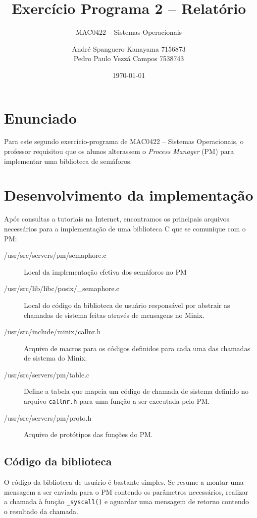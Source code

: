 \documentclass[brazil, a4paper]{scrartcl}
\begin{document}
\title{Exercício Programa 2 -- Relatório}
\subtitle{MAC0422 -- Sistemas Operacionais}
\author{André Spanguero Kanayama \hfill 7156873\\
		Pedro Paulo Vezzá Campos \hfill 7538743}
\date{\today}

\maketitle


\section{Enunciado}
Para este segundo exercício-programa de MAC0422 -- Sistemas Operacionais, o 
professor requisitou que os alunos alterassem o \emph{Process Manager} (PM)
para implementar uma biblioteca de semáforos. 


\section{Desenvolvimento da implementação}
Após consultas a tutoriais na Internet, encontramos os principais arquivos
necessários para a implementação de uma biblioteca C que se comunique com o PM:

\begin{description}
	\item[/usr/src/servers/pm/semaphore.c] Local da implementação efetiva dos
	semáforos no PM
	\item[/usr/src/lib/libc/posix/\_semaphore.c] Local do código da biblioteca
	de usuário responsável por abstrair as chamadas de sistema feitas através
	de mensagens no Minix.
	\item[/usr/src/include/minix/callnr.h] Arquivo de macros para os códigos
	definidos para cada uma das chamadas de sistema do Minix.
	\item[/usr/src/servers/pm/table.c] Define a tabela que mapeia um código de
	chamada de sistema definido no arquivo \texttt{callnr.h} para uma função a
	ser executada pelo PM.
	\item[/usr/src/servers/pm/proto.h] Arquivo de protótipos das funções do PM.
\end{description}

\subsection{Código da biblioteca}
O código da biblioteca de usuário é bastante simples. Se resume a montar uma
mensagem a ser enviada para o PM contendo os parâmetros necessários, realizar
a chamada à função \texttt{\_syscall()} e aguardar uma mensagem de retorno 
contendo o resultado da chamada.
\end{document}
